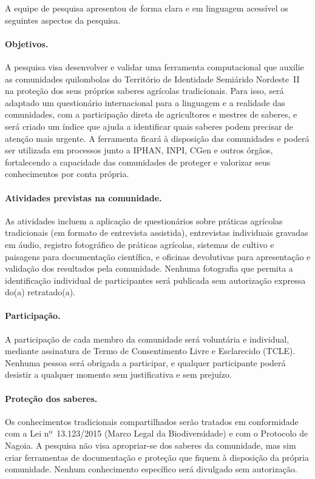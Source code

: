 \documentclass[12pt,a4paper,brazil]{article}
\begin{document}
A equipe de pesquisa apresentou de forma clara e em linguagem acessível os seguintes aspectos da pesquisa.

\paragraph{Objetivos.} A pesquisa visa desenvolver e validar uma ferramenta computacional que auxilie as comunidades quilombolas do Território de Identidade Semiárido Nordeste~II na proteção dos seus próprios saberes agrícolas tradicionais. Para isso, será adaptado um questionário internacional para a linguagem e a realidade das comunidades, com a participação direta de agricultores e mestres de saberes, e será criado um índice que ajuda a identificar quais saberes podem precisar de atenção mais urgente. A ferramenta ficará à disposição das comunidades e poderá ser utilizada em processos junto a IPHAN, INPI, CGen e outros órgãos, fortalecendo a capacidade das comunidades de proteger e valorizar seus conhecimentos por conta própria.

\paragraph{Atividades previstas na comunidade.} As atividades incluem a aplicação de questionários sobre práticas agrícolas tradicionais (em formato de entrevista assistida), entrevistas individuais gravadas em áudio, registro fotográfico de práticas agrícolas, sistemas de cultivo e paisagens para documentação científica, e oficinas devolutivas para apresentação e validação dos resultados pela comunidade. Nenhuma fotografia que permita a identificação individual de participantes será publicada sem autorização expressa do(a) retratado(a).

\paragraph{Participação.} A participação de cada membro da comunidade será voluntária e individual, mediante assinatura de Termo de Consentimento Livre e Esclarecido (TCLE). Nenhuma pessoa será obrigada a participar, e qualquer participante poderá desistir a qualquer momento sem justificativa e sem prejuízo.

\paragraph{Proteção dos saberes.} Os conhecimentos tradicionais compartilhados serão tratados em conformidade com a Lei nº~13.123/2015 (Marco Legal da Biodiversidade) e com o Protocolo de Nagoia. A pesquisa não visa apropriar-se dos saberes da comunidade, mas sim criar ferramentas de documentação e proteção que fiquem à disposição da própria comunidade. Nenhum conhecimento específico será divulgado sem autorização.
\end{document}
